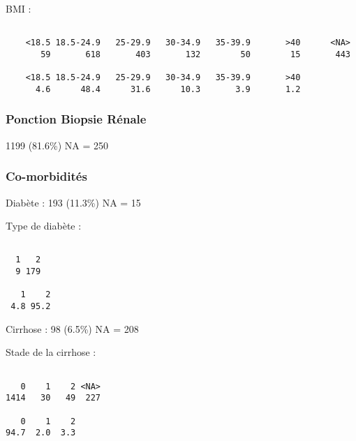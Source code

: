 \documentclass[11pt,a4paper]{article}\usepackage[]{graphicx}\usepackage[]{color}
\makeatletter
\newenvironment{kframe}{%
 \def\at@end@of@kframe{}%
 \ifinner\ifhmode%
  \def\at@end@of@kframe{\end{minipage}}%
  \begin{minipage}{\columnwidth}%
 \fi\fi%
 \def\FrameCommand##1{\hskip\@totalleftmargin \hskip-\fboxsep
 \colorbox{shadecolor}{##1}\hskip-\fboxsep
     \hskip-\linewidth \hskip-\@totalleftmargin \hskip\columnwidth}%
 \MakeFramed {\advance\hsize-\width
   \@totalleftmargin\z@ \linewidth\hsize
   \@setminipage}}%
 {\par\unskip\endMakeFramed%
 \at@end@of@kframe}
\newenvironment{knitrout}{}{} %
\makeatother
\begin{document}
BMI :

\begin{knitrout}
\color{fgcolor}\begin{kframe}
\begin{verbatim}

    <18.5 18.5-24.9   25-29.9   30-34.9   35-39.9       >40      <NA> 
       59       618       403       132        50        15       443 

    <18.5 18.5-24.9   25-29.9   30-34.9   35-39.9       >40 
      4.6      48.4      31.6      10.3       3.9       1.2 
\end{verbatim}
\end{kframe}
\end{knitrout}

      \subsubsection{Ponction Biopsie Rénale}

1199 (81.6\%) NA = 250

      \subsubsection{Co-morbidités}



Diabète : 193 (11.3\%) NA = 15

Type de diabète :
\begin{knitrout}
\color{fgcolor}\begin{kframe}
\begin{verbatim}

  1   2 
  9 179 

   1    2 
 4.8 95.2 
\end{verbatim}
\end{kframe}
\end{knitrout}

Cirrhose : 98 (6.5\%) NA = 208

Stade de la cirrhose :

\begin{knitrout}
\color{fgcolor}\begin{kframe}
\begin{verbatim}

   0    1    2 <NA> 
1414   30   49  227 

   0    1    2 
94.7  2.0  3.3 
\end{verbatim}
\end{kframe}
\end{knitrout}
\end{document}

